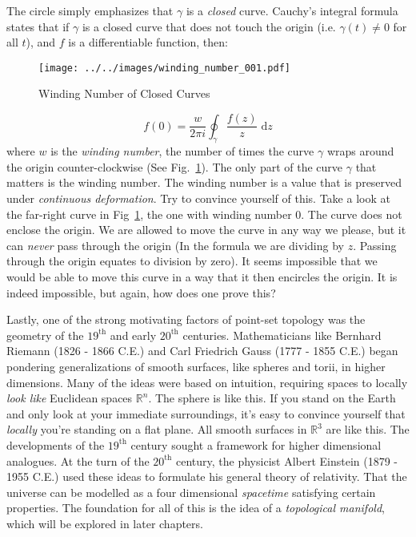     The circle simply emphasizes that $\gamma$ is a \textit{closed} curve.
    Cauchy's integral formula
    states that if $\gamma$ is a closed curve that
    does not touch the origin (i.e. $\gamma(t)\ne{0}$ for all $t$), and
    $f$ is a differentiable function, then:
    \begin{figure}
        \centering
        \texttt{[image: ../../images/winding\_number\_001.pdf]}
        \caption{Winding Number of Closed Curves}
        \label{fig:winding_number_001}
    \end{figure}
    \begin{equation}
        f(0)=\frac{w}{2\pi{i}}\oint_{\gamma}\frac{f(z)}{z}\;\textrm{d}z
    \end{equation}
    where $w$ is the \textit{winding number},
    the number of times the curve
    $\gamma$ wraps around the origin counter-clockwise
    (See Fig.~\ref{fig:winding_number_001}). The only part of the curve
    $\gamma$ that matters is the winding number. The winding number is a value
    that is preserved under \textit{continuous deformation}. Try to convince
    yourself of this. Take a look at the far-right curve in
    Fig~\ref{fig:winding_number_001}, the one with winding number 0. The curve
    does not enclose the origin. We are allowed to move the curve in any way
    we please, but it can \textit{never} pass through the origin
    (In the formula we are dividing by $z$. Passing through the origin equates
    to division by zero). It seems impossible that we would be able to move this
    curve in a way that it then encircles the origin. It is indeed impossible,
    but again, how does one prove this?
    \par\hfill\par
    Lastly, one of the strong motivating factors of point-set topology was
    the geometry of the $19^{\textrm{th}}$ and early
    $20^{\textrm{th}}$ centuries. Mathematicians like
    Bernhard Riemann (1826 - 1866 C.E.) and
    Carl Friedrich Gauss
    (1777 - 1855 C.E.) began pondering generalizations of smooth surfaces,
    like spheres and torii, in higher dimensions. Many of the ideas were based
    on intuition, requiring spaces to locally \textit{look like} Euclidean
    spaces $\mathbb{R}^{n}$. The sphere is like this. If you stand on the Earth
    and only look at your immediate surroundings, it's easy to convince yourself
    that \textit{locally} you're standing on a flat plane. All smooth surfaces
    in $\mathbb{R}^{3}$ are like this. The developments of the
    $19^{\textrm{th}}$ century sought a framework for higher dimensional
    analogues. At the turn of the $20^{\textrm{th}}$ century, the physicist
    Albert Einstein (1879 - 1955 C.E.)
    used these ideas to formulate his
    general theory of relativity. That the universe can be modelled as a
    four dimensional \textit{spacetime} satisfying certain properties. The
    foundation for all of this is the idea of a \textit{topological manifold},
    which will be explored in later chapters.
